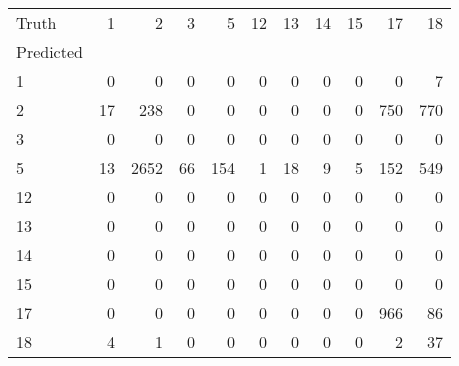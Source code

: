 \begin{tabular}{lrrrrrrrrrr}
\toprule
Truth & 1 & 2 & 3 & 5 & 12 & 13 & 14 & 15 & 17 & 18 \\
Predicted &  &  &  &  &  &  &  &  &  &  \\
\midrule
1 & 0 & 0 & 0 & 0 & 0 & 0 & 0 & 0 & 0 & 7 \\
2 & 17 & 238 & 0 & 0 & 0 & 0 & 0 & 0 & 750 & 770 \\
3 & 0 & 0 & 0 & 0 & 0 & 0 & 0 & 0 & 0 & 0 \\
5 & 13 & 2652 & 66 & 154 & 1 & 18 & 9 & 5 & 152 & 549 \\
12 & 0 & 0 & 0 & 0 & 0 & 0 & 0 & 0 & 0 & 0 \\
13 & 0 & 0 & 0 & 0 & 0 & 0 & 0 & 0 & 0 & 0 \\
14 & 0 & 0 & 0 & 0 & 0 & 0 & 0 & 0 & 0 & 0 \\
15 & 0 & 0 & 0 & 0 & 0 & 0 & 0 & 0 & 0 & 0 \\
17 & 0 & 0 & 0 & 0 & 0 & 0 & 0 & 0 & 966 & 86 \\
18 & 4 & 1 & 0 & 0 & 0 & 0 & 0 & 0 & 2 & 37 \\
\bottomrule
\end{tabular}

